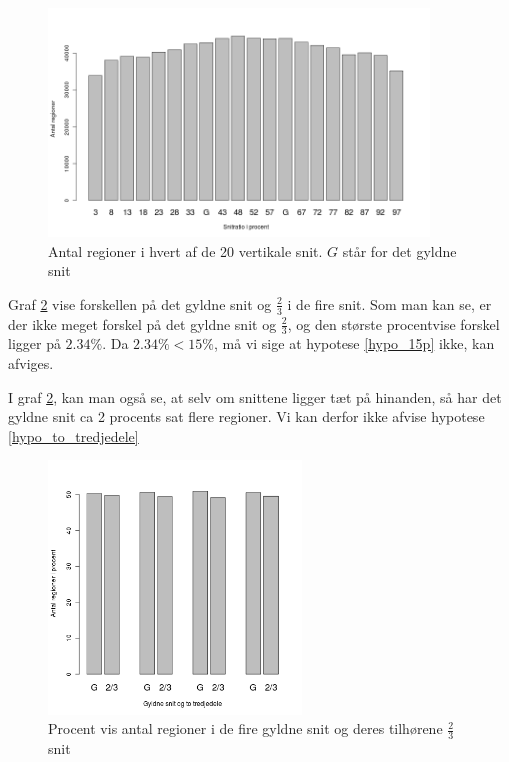 \begin{figure}[h!]
	\begin{center}
		\includegraphics[width=0.9\textwidth]{afsnit/resultater/billeder/cut0cut1eatsperratio.png}
	\end{center}
	\caption{Antal regioner i hvert af de 20 vertikale snit. $G$ står for det gyldne snit}
	\label{antal_regioner_vertikale_cut}
\end{figure}

Graf \ref{G_vs_to_trejedele} vise forskellen på det gyldne snit og
$\frac{2}{3}$ i de fire snit. Som man kan se, er der ikke meget forskel
på det gyldne snit og $\frac{2}{3}$, og den største procentvise forskel
ligger på $2.34\%$. Da $2.34 \% < 15\%$, må vi sige at hypotese
\ref{hypo_15p} ikke, kan afviges.

I graf \ref{G_vs_to_trejedele}, kan man også se, at selv om snittene
ligger tæt på hinanden, så har det gyldne snit ca 2 procents sat
flere regioner. Vi kan derfor ikke afvise hypotese
\ref{hypo_to_tredjedele}

\begin{figure}[h!]
	\begin{center}
		\includegraphics[width=0.6\textwidth]{afsnit/resultater/billeder/G_vs_to_tredjedele.png}
	\end{center}
	\caption{Procent vis antal regioner i de fire gyldne snit og deres tilhørene $\frac{2}{3}$ snit}
	\label{G_vs_to_trejedele}
\end{figure}

